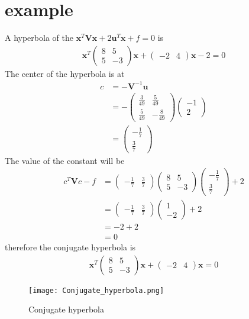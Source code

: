 \documentclass[journal,12pt,twocolumn]{IEEEtran}
\newcommand{\myvec}[1]{\ensuremath{\begin{pmatrix}#1\end{pmatrix}}}
\numberwithin{equation}{subsection}
\let\vec\mathbf
\begin{document}
\section{example}
A hyperbola of the $\vec{x}^T\vec{V}\vec{x}+2\vec{u}^T\vec{x}+f=0$ is
\begin{align}
    \vec{x}^T\myvec{8&5\\5&-3}\vec{x}+\myvec{-2&4}\vec{x}-2=0
\end{align}
The center of the hyperbola is at
\begin{align}
    c&=-\vec{V}^{-1}\vec{u}\\
    &=-\myvec{\frac{3}{49}&\frac{5}{49}\\\frac{5}{49}&-\frac{8}{49}}\myvec{-1\\2}\\
    &=\myvec{-\frac{1}{7}\\\frac{3}{7}}
\end{align}
The value of the constant will be
\begin{align}
    c^T\vec{V}c-f&=\myvec{-\frac{1}{7}&\frac{3}{7}}\myvec{8&5\\5&-3}\myvec{-\frac{1}{7}\\\frac{3}{7}}+2\\
    &=\myvec{-\frac{1}{7}&\frac{3}{7}}\myvec{1\\-2}+2\\
    &=-2+2\\
    &=0
\end{align}
therefore the conjugate hyperbola is 
\begin{align}
    \vec{x}^T\myvec{8&5\\5&-3}\vec{x}+\myvec{-2&4}\vec{x}=0
\end{align}
\begin{figure}[h]
    \centering
    \texttt{[image: Conjugate\_hyperbola.png]}
    \caption{Conjugate hyperbola}
    \label{fig:my_label}
\end{figure}
\end{document}
